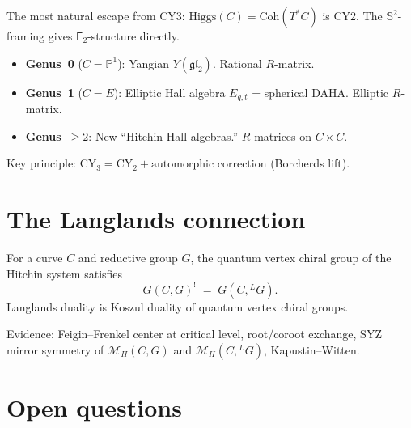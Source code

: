 \documentclass[11pt]{article}
\newcommand{\cM}{\mathcal{M}}
\newcommand{\fgl}{\mathfrak{gl}}
\newcommand{\bP}{\mathbb{P}}
\newcommand{\bS}{\mathbb{S}}
\newcommand{\Etwo}{\mathsf{E}_2}
\newcommand{\CY}{\mathrm{CY}}
\newcommand{\Coh}{\mathrm{Coh}}
\begin{document}
The most natural escape from CY3: $\mathrm{Higgs}(C) = \Coh(T^*C)$ is CY2. The $\bS^2$-framing gives $\Etwo$-structure directly.

\begin{itemize}
 \item \textbf{Genus~0} ($C = \bP^1$): Yangian $Y(\fgl_2)$. Rational $R$-matrix.
 \item \textbf{Genus~1} ($C = E$): Elliptic Hall algebra $E_{q,t}$ = spherical DAHA. Elliptic $R$-matrix.
 \item \textbf{Genus~$\geq 2$}: New ``Hitchin Hall algebras.'' $R$-matrices on $C \times C$.
\end{itemize}

Key principle: $\CY_3 = \CY_2 + \text{automorphic correction}$ (Borcherds lift).

\section{The Langlands connection}

\begin{conjecture}[Langlands = Koszul]
For a curve $C$ and reductive group $G$, the quantum vertex chiral group of the Hitchin system satisfies
\[
 G(C, G)^! \;=\; G(C, {}^L G).
\]
Langlands duality is Koszul duality of quantum vertex chiral groups.
\end{conjecture}

Evidence: Feigin--Frenkel center at critical level, root/coroot exchange, SYZ mirror symmetry of $\cM_H(C,G)$ and $\cM_H(C, {}^L G)$, Kapustin--Witten.

\section{Open questions}
\label{sec:open-questions}
\end{document}

